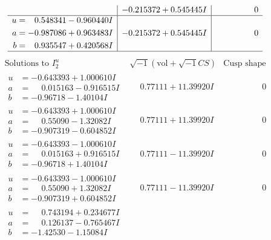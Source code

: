 \documentclass[1p]{elsarticle_modified}
\theoremstyle{definition}
\newcommand{\I}{\sqrt{-1}}
\begin{document}
$$\begin{array}{c|c|c}
 & -0.215372 + 0.545445 I & \phantom{-0.000000 } 0 \\ \hline\begin{aligned}
u &= \phantom{-}0.548341 - 0.960440 I \\
a &= -0.987086 + 0.963483 I \\
b &= \phantom{-}0.935547 + 0.420568 I\end{aligned}
 & -0.215372 + 0.545445 I & \phantom{-0.000000 } 0\\
 \hline 
 \end{array}$$\newpage$$\begin{array}{c|c|c}  
\text{Solutions to }I^u_{2}& \I (\text{vol} + \sqrt{-1}CS) & \text{Cusp shape}\\
 \hline 
\begin{aligned}
u &= -0.643393 + 1.000610 I \\
a &= \phantom{-}0.015163 - 0.916515 I \\
b &= -0.96718 - 1.40104 I\end{aligned}
 & \phantom{-}0.77111 + 11.39920 I & \phantom{-0.000000 } 0 \\ \hline\begin{aligned}
u &= -0.643393 + 1.000610 I \\
a &= \phantom{-}0.55090 - 1.32082 I \\
b &= -0.907319 - 0.604852 I\end{aligned}
 & \phantom{-}0.77111 + 11.39920 I & \phantom{-0.000000 } 0 \\ \hline\begin{aligned}
u &= -0.643393 - 1.000610 I \\
a &= \phantom{-}0.015163 + 0.916515 I \\
b &= -0.96718 + 1.40104 I\end{aligned}
 & \phantom{-}0.77111 - 11.39920 I & \phantom{-0.000000 } 0 \\ \hline\begin{aligned}
u &= -0.643393 - 1.000610 I \\
a &= \phantom{-}0.55090 + 1.32082 I \\
b &= -0.907319 + 0.604852 I\end{aligned}
 & \phantom{-}0.77111 - 11.39920 I & \phantom{-0.000000 } 0 \\ \hline\begin{aligned}
u &= \phantom{-}0.743194 + 0.234677 I \\
a &= \phantom{-}0.126137 - 0.765467 I \\
b &= -1.42530 - 1.15084 I\end{aligned}

\end{array}$$
\end{document}
